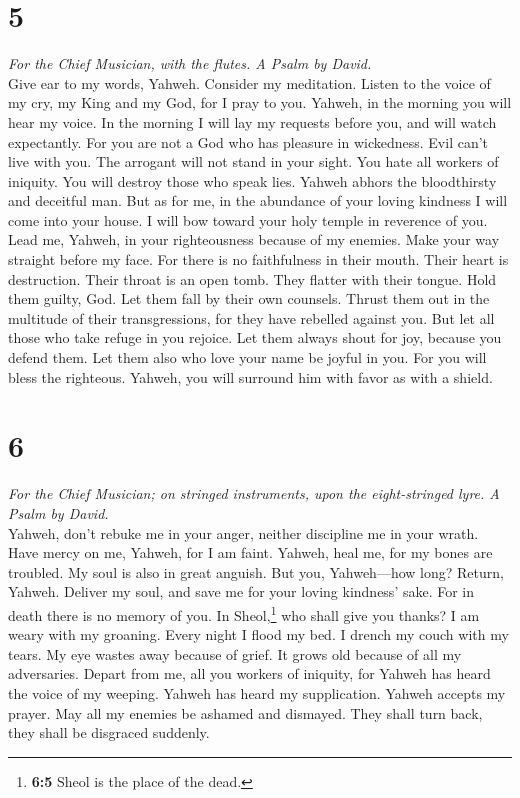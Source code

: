 \hypertarget{section-4}{%
\section{5}\label{section-4}}

\emph{For the Chief Musician, with the flutes. A Psalm by David.}\\
 Give ear to my words, Yahweh. Consider my meditation.
 Listen to the voice of my cry, my King and my God, for I
pray to you.  Yahweh, in the morning you will hear my
voice. In the morning I will lay my requests before you, and will watch
expectantly.  For you are not a God who has pleasure in
wickedness. Evil can't live with you.  The arrogant will
not stand in your sight. You hate all workers of iniquity.
 You will destroy those who speak lies. Yahweh abhors the
bloodthirsty and deceitful man.  But as for me, in the
abundance of your loving kindness I will come into your house. I will
bow toward your holy temple in reverence of you.  Lead me,
Yahweh, in your righteousness because of my enemies. Make your way
straight before my face.  For there is no faithfulness in
their mouth. Their heart is destruction. Their throat is an open tomb.
They flatter with their tongue.  Hold them guilty, God.
Let them fall by their own counsels. Thrust them out in the multitude of
their transgressions, for they have rebelled against you.
 But let all those who take refuge in you rejoice. Let
them always shout for joy, because you defend them. Let them also who
love your name be joyful in you.  For you will bless the
righteous. Yahweh, you will surround him with favor as with a shield.

\hypertarget{section-5}{%
\section{6}\label{section-5}}

\emph{For the Chief Musician; on stringed instruments, upon the
eight-stringed lyre. A Psalm by David.}\\
 Yahweh, don't rebuke me in your anger, neither discipline
me in your wrath.  Have mercy on me, Yahweh, for I am
faint. Yahweh, heal me, for my bones are troubled.  My
soul is also in great anguish. But you, Yahweh---how long?
 Return, Yahweh. Deliver my soul, and save me for your
loving kindness' sake.  For in death there is no memory of
you. In Sheol,\footnote{\textbf{6:5} Sheol is the place of the dead.}
who shall give you thanks?  I am weary with my groaning.
Every night I flood my bed. I drench my couch with my tears.
 My eye wastes away because of grief. It grows old because
of all my adversaries.  Depart from me, all you workers of
iniquity, for Yahweh has heard the voice of my weeping. 
Yahweh has heard my supplication. Yahweh accepts my prayer.
 May all my enemies be ashamed and dismayed. They shall
turn back, they shall be disgraced suddenly.

